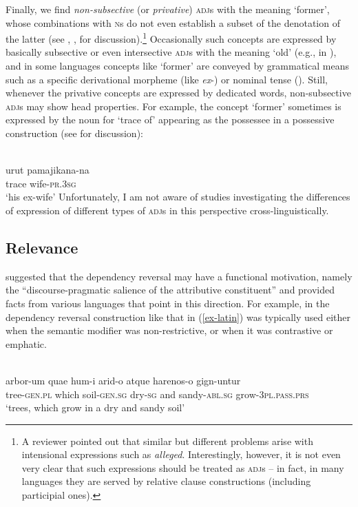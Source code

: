 \documentclass[output=paper
  ,nobabel
  ,draftmode
  ,colorlinks, citecolor=brown
]{langscibook}
\begin{document}
Finally, we find \emph{non-subsective} (or \emph{privative}) \textsc{adj}s with the meaning `former', whose combinations with
\textsc{n}s do not even establish a subset of the denotation of the latter (see \cite{Kamp1975}, \cite{KampPartee1995}, \cite{Partee2010} for discussion).\footnote{A reviewer pointed out that similar but different problems arise with intensional expressions such as \emph{alleged}. Interestingly, however, it is not even very clear that such expressions should be treated as \textsc{adj}s – in fact, in many languages they are served by relative clause constructions (including participial ones).} Occasionally such concepts are expressed by basically subsective or even intersective \textsc{adj}s with the meaning `old' (e.g., in ), and in some languages concepts like `former' are conveyed by grammatical means such as a specific derivational morpheme (like  \emph{ex}-) or nominal tense (\cite{NordlingerSadler2004}). Still, whenever the privative concepts are expressed by dedicated words, non-subsective \textsc{adj}s may show head properties. For example, the concept `former' sometimes is expressed by the noun for `trace of' appearing as the possessee in a possessive construction (see \citealt{Lander2009} for discussion):

\ea 
{}\\
\gll urut 	pamajikana-na \\ 	
     trace	wife-\textsc{pr.3sg} \\
\glt `his ex-wife'
\z
Unfortunately, I am not aware of studies investigating the differences of expression of different types of \textsc{adj}s in this perspective cross-linguistically.

\subsection{Relevance}\label{sec-relevance}

\citet*[55]{Malchukov2000} suggested that the dependency reversal may have a functional motivation, namely the ``discourse-pragmatic salience of the attributive constituent'' and provided facts from various languages that point in this direction. For example, in  the dependency reversal construction like that in (\ref{ex-latin}) was typically used either when the semantic modifier was non-restrictive, or when it was contrastive or emphatic. 


\ea\label{ex-latin} 
\\
\gll  arbor-um	quae	hum-i		arid-o atque harenos-o	gign-untur \\ 
      tree-\textsc{gen.pl} which soil-\textsc{gen.sg}	dry-\textsc{sg}	and	sandy-\textsc{abl.sg} grow-\textsc{3pl.pass.prs} \\
\glt `trees, which grow in a dry and sandy soil'
\z
\end{document}
